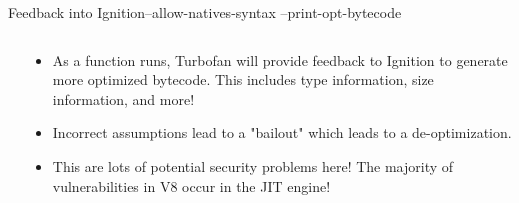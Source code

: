 \begin{frame}{Feedback into Ignition}{--allow-natives-syntax --print-opt-bytecode}
    \begin{columns}
        \begin{column}{0.5\textwidth}
            \inputminted{js}{code/ignition-feedback.tex}
        \end{column}
        \begin{column}{0.5\textwidth}
            \begin{itemize}
                \item  As a function runs, Turbofan will provide feedback to Ignition to generate more optimized bytecode. This includes type information, size information, and more! 
                \item Incorrect assumptions lead to a "bailout" which leads to a de-optimization.
                \item This are lots of potential security problems here! The majority of vulnerabilities in V8 occur in the JIT engine!
            \end{itemize}
        \end{column}
    \end{columns}
\end{frame}

